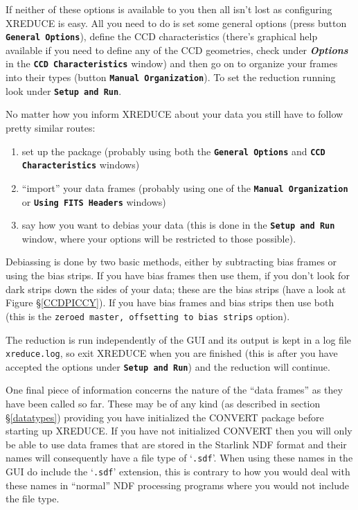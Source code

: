 \documentclass[twoside,11pt]{article}
\newcommand{\hyperref}[4]{#2\ref{#4}#3}
\newcommand{\xref}[3]{#1}
\renewcommand{\_}{\texttt{\symbol{95}}}
\newcommand{\butt}[1]{{\small \bf \tt #1}}
\newcommand{\menu}[1]{{\small \bf \em #1}}
\newcommand{\text}[1]{{\small \tt #1}}
\newcommand{\routine}[1]{{\sc #1}}
\begin{document}
If neither of these options is available to you then all isn't lost as
configuring \routine{XREDUCE} is easy. All you need to do is set some
general options (press button \butt{General Options}), define the CCD
characteristics (there's graphical help available if you need to
define any of the CCD geometries, check under \menu{Options} in the
\butt{CCD Characteristics} window) and then go on to organize your
frames into their types (button \butt{Manual Organization}). To set
the reduction running look under \butt{Setup and Run}.

No matter how you inform \routine{XREDUCE} about your data you still
have to follow pretty similar routes:
\begin{enumerate}
\item set up the package (probably using both the \butt{General Options}
and \butt{CCD Characteristics} windows)
\item ``import'' your data frames (probably using one of the
\butt{Manual Organization} or \butt{Using FITS Headers} windows)
\item say how you want to debias your data (this is done in the
\butt{Setup and Run} window, where your options will be restricted
to those possible).
\end{enumerate}
Debiassing is done by two basic methods, either by subtracting bias frames
or using the bias strips. If you have bias frames then use them, if
you don't look for dark strips down the sides of your data; these are
the bias strips (have a look at \hyperref{this figure}{Figure
\S}{}{CCDPICCY}).
If you have bias frames and bias strips then use both (this is the
\text{zeroed master, offsetting to bias strips} option).

The reduction is run independently of the GUI and its output is kept
in a log file \text{xreduce.log}, so exit \routine{XREDUCE} when you
are finished (this is after you have accepted the options under
\butt{Setup and Run}) and the reduction will continue.

One final piece of information concerns the nature of the ``data
frames'' as they have been called so far. These may be of any kind (as
described \hyperref{later}{in section \S}{}{datatypes}) providing you
have initialized the \xref{CONVERT}{sun55}{} package before starting
up \routine{XREDUCE}.  If you have not initialized CONVERT then you
will only be able to use data frames that are stored in the Starlink
\xref{NDF}{sun33}{} format and their names will consequently have a
file type of `\text{.sdf}'. When using these names in the GUI do
include the `\text{.sdf}' extension, this is contrary to how you would
deal with these names in ``normal'' NDF processing programs where you
would not include the file type.
\end{document}
